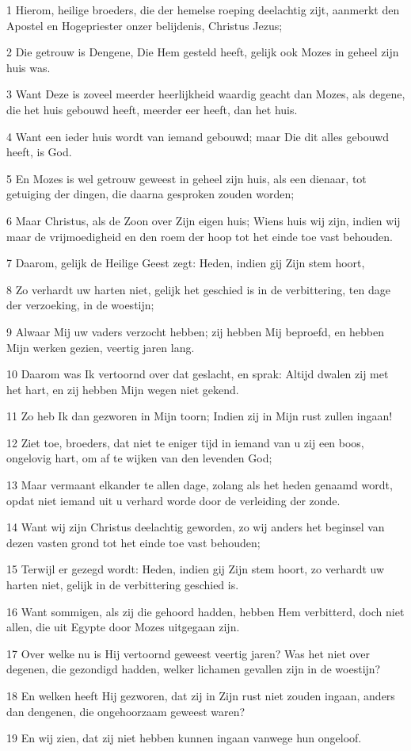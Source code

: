 \par 1 Hierom, heilige broeders, die der hemelse roeping deelachtig zijt, aanmerkt den Apostel en Hogepriester onzer belijdenis, Christus Jezus;
\par 2 Die getrouw is Dengene, Die Hem gesteld heeft, gelijk ook Mozes in geheel zijn huis was.
\par 3 Want Deze is zoveel meerder heerlijkheid waardig geacht dan Mozes, als degene, die het huis gebouwd heeft, meerder eer heeft, dan het huis.
\par 4 Want een ieder huis wordt van iemand gebouwd; maar Die dit alles gebouwd heeft, is God.
\par 5 En Mozes is wel getrouw geweest in geheel zijn huis, als een dienaar, tot getuiging der dingen, die daarna gesproken zouden worden;
\par 6 Maar Christus, als de Zoon over Zijn eigen huis; Wiens huis wij zijn, indien wij maar de vrijmoedigheid en den roem der hoop tot het einde toe vast behouden.
\par 7 Daarom, gelijk de Heilige Geest zegt: Heden, indien gij Zijn stem hoort,
\par 8 Zo verhardt uw harten niet, gelijk het geschied is in de verbittering, ten dage der verzoeking, in de woestijn;
\par 9 Alwaar Mij uw vaders verzocht hebben; zij hebben Mij beproefd, en hebben Mijn werken gezien, veertig jaren lang.
\par 10 Daarom was Ik vertoornd over dat geslacht, en sprak: Altijd dwalen zij met het hart, en zij hebben Mijn wegen niet gekend.
\par 11 Zo heb Ik dan gezworen in Mijn toorn; Indien zij in Mijn rust zullen ingaan!
\par 12 Ziet toe, broeders, dat niet te eniger tijd in iemand van u zij een boos, ongelovig hart, om af te wijken van den levenden God;
\par 13 Maar vermaant elkander te allen dage, zolang als het heden genaamd wordt, opdat niet iemand uit u verhard worde door de verleiding der zonde.
\par 14 Want wij zijn Christus deelachtig geworden, zo wij anders het beginsel van dezen vasten grond tot het einde toe vast behouden;
\par 15 Terwijl er gezegd wordt: Heden, indien gij Zijn stem hoort, zo verhardt uw harten niet, gelijk in de verbittering geschied is.
\par 16 Want sommigen, als zij die gehoord hadden, hebben Hem verbitterd, doch niet allen, die uit Egypte door Mozes uitgegaan zijn.
\par 17 Over welke nu is Hij vertoornd geweest veertig jaren? Was het niet over degenen, die gezondigd hadden, welker lichamen gevallen zijn in de woestijn?
\par 18 En welken heeft Hij gezworen, dat zij in Zijn rust niet zouden ingaan, anders dan dengenen, die ongehoorzaam geweest waren?
\par 19 En wij zien, dat zij niet hebben kunnen ingaan vanwege hun ongeloof.

